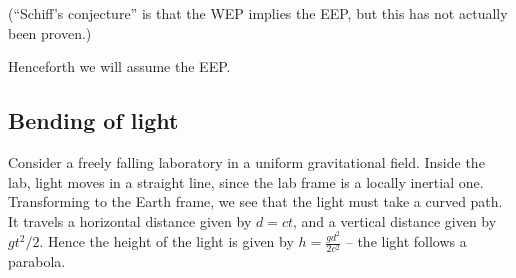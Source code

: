 \documentclass{jknotes}
\begin{document}
(``Schiff's conjecture'' is that the WEP implies the EEP, but this has not actually been proven.)

Henceforth we will assume the EEP.

\subsection{Bending of light}

Consider a freely falling laboratory in a uniform gravitational field. Inside the lab, light moves in a straight line, since the lab frame is a locally inertial one. Transforming to the Earth frame, we see that the light must take a curved path. It travels a horizontal distance given by \(d=ct\), and a vertical distance given by \(gt^2/2\). Hence the height of the light is given by \(h=\frac{gd^2}{2c^2}\) -- the light follows a parabola.
\end{document}
